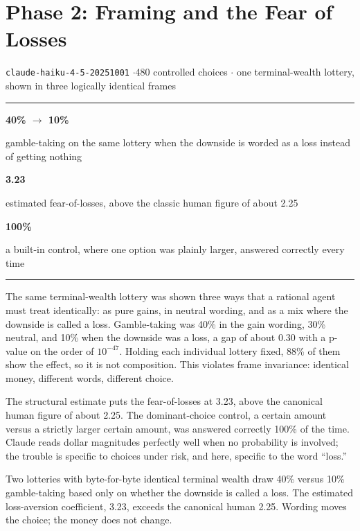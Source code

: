 \documentclass[11pt]{article}
\newcommand{\herostat}[2]{%
  \begin{minipage}[t]{0.315\linewidth}%
    \centering
    {\fontsize{30}{32}\selectfont\bfseries\color{moss} #1}\\[5pt]
    {\footnotesize\color{mutegray}\setlength{\baselineskip}{11pt} #2\par}%
  \end{minipage}%
}
\newenvironment{herorow}
  {\par\vspace{4pt}\noindent\color{rulegray}\rule{\linewidth}{0.8pt}\par
   \vspace{9pt}\noindent}
  {\par\vspace{9pt}\noindent\color{rulegray}\rule{\linewidth}{0.8pt}\par\vspace{4pt}}
\begin{document}
\section{Phase 2: Framing and the Fear of Losses}

{\small\color{mutegray} \texttt{claude-haiku-4-5-20251001} \;$\cdot$480 controlled choices
\;$\cdot$\; one terminal-wealth lottery, shown in three logically identical frames}

\begin{herorow}
\herostat{40\% $\rightarrow$ 10\%}{gamble-taking on the same lottery when the downside is worded as a
loss instead of getting nothing}%
\hfill
\herostat{3.23}{estimated fear-of-losses, above the classic human figure of about 2.25}%
\hfill
\herostat{100\%}{a built-in control, where one option was plainly larger, answered correctly every time}
\end{herorow}

The same terminal-wealth lottery was shown three ways that a rational agent must treat identically: as
pure gains, in neutral wording, and as a mix where the downside is called a loss. Gamble-taking was
40\% in the gain wording, 30\% neutral, and 10\% when the downside was a loss, a gap of about 0.30
with a p-value on the order of $10^{-47}$. Holding each individual lottery fixed, 88\% of them show the
effect, so it is not composition. This violates frame invariance: identical money, different words,
different choice.

The structural estimate puts the fear-of-losses at 3.23, above the canonical human figure of about
2.25. The dominant-choice control, a certain amount versus a strictly larger certain amount, was
answered correctly 100\% of the time. Claude reads dollar magnitudes perfectly well when no
probability is involved; the trouble is specific to choices under risk, and here, specific to the word
``loss.''

\begin{resultcard}
Two lotteries with byte-for-byte identical terminal wealth draw 40\% versus 10\% gamble-taking based
only on whether the downside is called a loss. The estimated loss-aversion coefficient, 3.23, exceeds
the canonical human 2.25. Wording moves the choice; the money does not change.
\end{resultcard}
\end{document}
